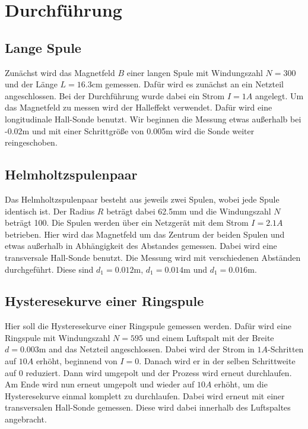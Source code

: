 \section{Durchführung}
\label{sec:Durchführung}

\subsection{Lange Spule}
\label{sec:LangeSpule}

Zunächst wird das Magnetfeld $B$ einer langen Spule mit Windungszahl $N = 300$ und der Länge $L = 16.3 \unit\cm$ gemessen.
Dafür wird es zunächst an ein Netzteil angeschlossen. Bei der Durchführung wurde dabei ein Strom $I = 1A$ angelegt.
Um das Magnetfeld zu messen wird der Halleffekt verwendet.
Dafür wird eine longitudinale Hall-Sonde benutzt.
Wir beginnen die Messung etwas außerhalb bei -0.02$\unit\m$ und mit einer Schrittgröße von 0.005$\unit\m$ wird die Sonde weiter reingeschoben.

\subsection{Helmholtzspulenpaar}
\label{sec:Spulenpaar}

Das Helmholtzspulenpaar besteht aus jeweils zwei Spulen, wobei jede Spule identisch ist.
Der Radius $R$ beträgt dabei 62.5$\unit\mm$ und die Windungszahl $N$ beträgt 100.
Die Spulen werden über ein Netzgerät mit dem Strom $I = 2.1A$ betrieben. 
Hier wird das Magnetfeld um das Zentrum der beiden Spulen und etwas außerhalb in Abhängigkeit des Abstandes gemessen.
Dabei wird eine transversale Hall-Sonde benutzt.
Die Messung wird mit verschiedenen Abständen durchgeführt.
Diese sind $d_{1} = 0.012 \unit\m$, $d_{1} = 0.014\unit\m$ und $d_{1} = 0.016\unit\m$.

\subsection{Hysteresekurve einer Ringspule}
\label{sec:Hysteresekurve}

Hier soll die Hysteresekurve einer Ringspule gemessen werden.
Dafür wird eine Ringspule mit Windungszahl $N = 595$ und einem Luftspalt mit der Breite $d = 0.003\unit\m$ and das Netzteil angeschlossen.
Dabei wird der Strom in $1A$-Schritten auf $10A$ erhöht, beginnend von $I = 0$.
Danach wird er in der selben Schrittweite auf 0 reduziert.
Dann wird umgepolt und der Prozess wird erneut durchlaufen.
Am Ende wird nun erneut umgepolt und wieder auf $10A$ erhöht, um die Hysteresekurve einmal komplett zu durchlaufen.
Dabei wird erneut mit einer transversalen Hall-Sonde gemessen.
Diese wird dabei innerhalb des Luftspaltes angebracht.